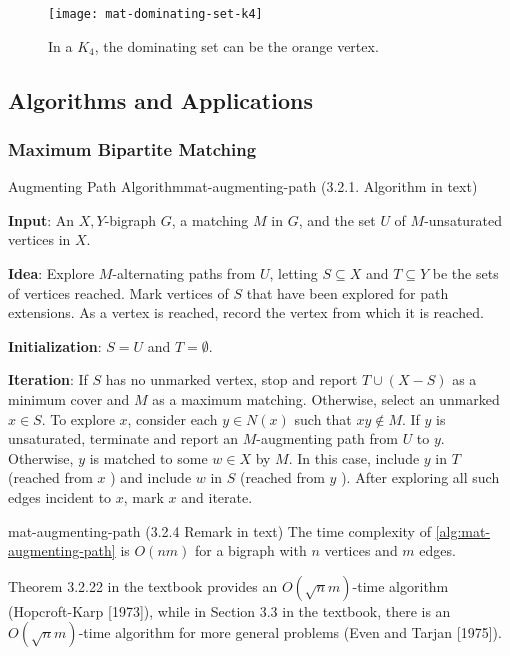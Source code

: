 \documentclass[../src/handouts/main.tex]{subfiles}
\begin{document}
\begin{figure}[htbp]
  \centering
  \texttt{[image: mat-dominating-set-k4]}
  \caption{In a $K_4$, the dominating set can be the orange vertex.}
  \label{fig:mat-dominating-set-k4}
\end{figure}

\subsection{Algorithms and Applications}

\subsubsection{Maximum Bipartite Matching}

\begin{algorithm}{Augmenting Path Algorithm}{mat-augmenting-path}
  (3.2.1. Algorithm in text)

  \textbf{Input}: An $X, Y$-bigraph $G$, a matching $M$ in $G$, and the set $U$ of $M$-unsaturated vertices in $X$.

  \textbf{Idea}: Explore $M$-alternating paths from $U$, letting $S \subseteq X$ and $T \subseteq Y$ be the sets of vertices reached. Mark vertices of $S$ that have been explored for path extensions. As a vertex is reached, record the vertex from which it is reached.

  \textbf{Initialization}: $S=U$ and $T=\emptyset$.

  \textbf{Iteration}: If $S$ has no unmarked vertex, stop and report $T \cup(X-S)$ as a minimum cover and $M$ as a maximum matching. Otherwise, select an unmarked $x \in S$. To explore $x$, consider each $y \in N(x)$ such that $x y \notin M$. If $y$ is unsaturated, terminate and report an $M$-augmenting path from $U$ to $y$. Otherwise, $y$ is matched to some $w \in X$ by $M$. In this case, include $y$ in $T$ (reached from $x$ ) and include $w$ in $S$ (reached from $y$ ). After exploring all such edges incident to $x$, mark $x$ and iterate.
\end{algorithm}

\begin{remark}{}{mat-augmenting-path}
  (3.2.4 Remark in text)
  The time complexity of \cref{alg:mat-augmenting-path} is $O(n m)$ for a bigraph with $n$ vertices and $m$ edges.

  Theorem 3.2.22 in the textbook provides an $O(\sqrt{n} m)$-time algorithm (Hopcroft-Karp [1973]), while in Section 3.3 in the textbook, there is an $O(\sqrt{n} m)$-time algorithm for more general problems (Even and Tarjan [1975]).
\end{remark}
\end{document}
